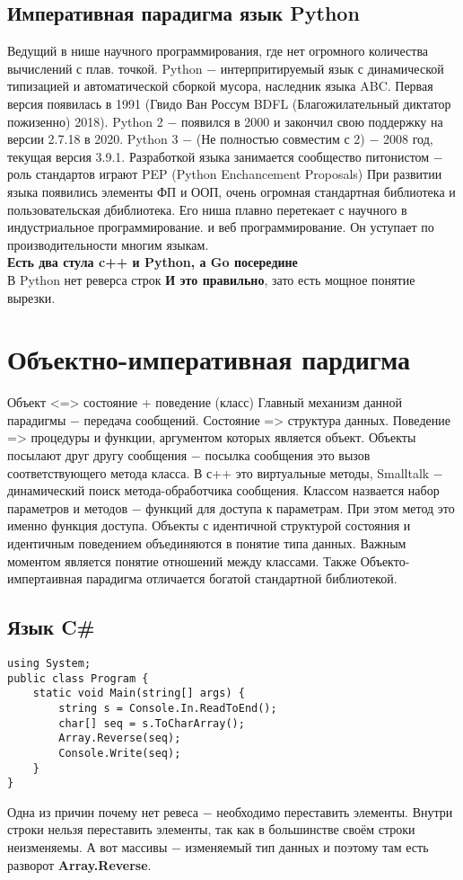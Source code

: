 \documentclass[a4paper, 12pt, titlepage, finall]{extreport}
\begin{document}
        \section{Императивная парадигма язык Python}
            Ведущий в нише научного программирования, где нет огромного количества вычислений с плав. точкой.
            Python $-$ интерпритируемый язык с динамической типизацией и автоматической сборкой мусора, наследник языка ABC.
            Первая версия появилась в 1991 (Гвидо Ван Россум BDFL (Благожилательный диктатор пожизенно) 2018).
            Python 2 $-$ появился в 2000 и закончил свою поддержку на версии 2.7.18 в 2020.
            Python 3 $-$ (Не полностью совместим с 2) $-$ 2008 год, текущая версия 3.9.1.
            Разработкой языка занимается сообщество питонистом $-$ роль стандартов играют PEP (Python Enchancement Proposals)
            При развитии языка появились элементы ФП и ООП, очень огромная стандартная библиотека и пользовательская дбиблиотека.
            Его ниша плавно перетекает с научного в индустриальное программирование. и веб программирование.
            Он уступает по производительности многим языкам.\\
            \textbf{Есть два стула c++ и Python, а Go посередине}\\
            В Python нет реверса строк \textbf{И это правильно}, зато есть мощное понятие вырезки.
    \chapter{Объектно-императивная пардигма}
        Объект <=> состояние + поведение (класс)
        Главный механизм данной парадигмы $-$ передача сообщений.
        Состояние => структура данных. Поведение => процедуры и функции, аргументом которых является объект.
        Объекты посылают друг другу сообщения $-$ посылка сообщения это вызов соответствующего метода класса. 
        В с++ это виртуальные методы, Smalltalk $-$ динамический поиск метода-обработчика сообщения.
        Классом назвается набор параметров и методов $-$ функций для доступа к параметрам. При этом метод это именно функция доступа.
        Объекты с идентичной структурой состояния и идентичным поведением объединяются в понятие типа данных.
        Важным моментом является понятие отношений между классами.
        Также Объекто-импертаивная парадигма отличается богатой стандартной библиотекой.

        \section{Язык C\#}
\begin{lstlisting}
using System;
public class Program {
    static void Main(string[] args) {
        string s = Console.In.ReadToEnd();
        char[] seq = s.ToCharArray();
        Array.Reverse(seq);
        Console.Write(seq);
    }
}
\end{lstlisting}
            Одна из причин почему нет ревеса $-$ необходимо переставить элементы.
            Внутри строки нельзя переставить элементы, так как в большинстве своём строки неизменяемы.
            А вот массивы $-$ изменяемый тип данных и поэтому там есть разворот \textbf{Array.Reverse}.
\end{document}
